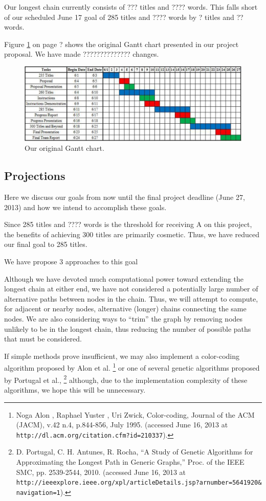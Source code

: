 \documentclass[11pt,english]{article}
\begin{document}
Our longest chain currently consists of ??? titles and ???? words. This falls
short of our scheduled June 17 goal of 285 titles and ???? words by ? titles
and ?? words.

Figure \ref{fig:gantto} on page ? shows the original Gantt chart presented in
our project proposal. We have made ?????????????? changes.
\begin{figure}[h]
\begin{center}
\includegraphics[width=\textwidth]{gantto}
\end{center}
\vspace{-0.5cm}
\caption{Our original Gantt chart.}
\label{fig:gantto}
\end{figure}

\subsection{Projections}
Here we discuss our goals from now until the final project deadline (June 27,
2013) and how we intend to accomplish these goals.

Since 285 titles and ???? words is the threshold for receiving A on this
project, the benefits of achieving 300 titles are primarily cosmetic. Thus, we
have reduced our final goal to 285 titles.

We have propose 3 approaches to this goal

Although we have devoted much computational power toward extending the longest
chain at either end, we have not considered a potentially large number
of alternative paths between nodes in the chain. Thus, we will attempt to
compute, for adjacent or nearby nodes, alternative (longer) chains connecting
the same nodes. We are also considering ways to ``trim'' the graph by removing
nodes unlikely to be in the longest chain, thus reducing the number of possible
paths that must be considered.

If simple methods prove insufficient, we may also implement a color-coding
algorithm proposed by Alon et al.
\footnote{Noga Alon , Raphael Yuster , Uri Zwick, Color-coding, Journal of the
ACM (JACM), v.42 n.4, p.844-856, July 1995. (accessed June 16, 2013 at
\texttt{http://dl.acm.org/citation.cfm?id=210337}).}
or one of several genetic algorithms proposed by Portugal et al.,
\footnote{
D. Portugal, C. H. Antunes, R. Rocha, ``A Study of Genetic Algorithms for
Approximating the Longest Path in Generic Graphs,'' Proc. of the IEEE SMC, pp.
2539-2544, 2010. (accessed June 16, 2013 at
\texttt{http://ieeexplore.ieee.org/xpl/articleDetails.jsp?arnumber=5641920\&
navigation=1}).}
although, due to the implementation complexity of these algorithms, we hope
this will be unnecessary.
\end{document}
